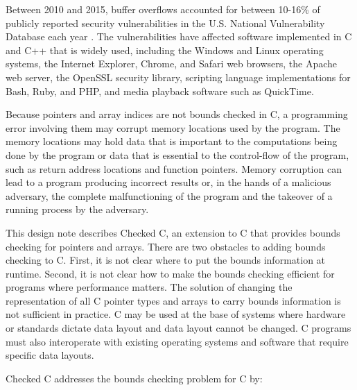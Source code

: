 \documentclass[]{article}
\begin{document}
Between 2010 and 2015, buffer overflows accounted for between 10-16\% of
publicly reported security vulnerabilities in the U.S. National
Vulnerability Database each year . The vulnerabilities have affected
software implemented in C and C++ that is widely used, including the
Windows and Linux operating systems, the Internet Explorer, Chrome, and
Safari web browsers, the Apache web server, the OpenSSL security
library, scripting language implementations for Bash, Ruby, and PHP, and
media playback software such as QuickTime.

Because pointers and array indices are not bounds checked in C, a
programming error involving them may corrupt memory locations used by
the program. The memory locations may hold data that is important to the
computations being done by the program or data that is essential to the
control-flow of the program, such as return address locations and
function pointers. Memory corruption can lead to a program producing
incorrect results or, in the hands of a malicious adversary, the
complete malfunctioning of the program and the takeover of a running
process by the adversary.

This design note describes Checked C, an extension to C that provides
bounds checking for pointers and arrays. There are two obstacles to
adding bounds checking to C. First, it is not clear where to put the
bounds information at runtime. Second, it is not clear how to make the
bounds checking efficient for programs where performance matters. The
solution of changing the representation of all C pointer types and
arrays to carry bounds information is not sufficient in practice. C may
be used at the base of systems where hardware or standards dictate data
layout and data layout cannot be changed. C programs must also
interoperate with existing operating systems and software that require
specific data layouts.

Checked C addresses the bounds checking problem for C by:
\end{document}
